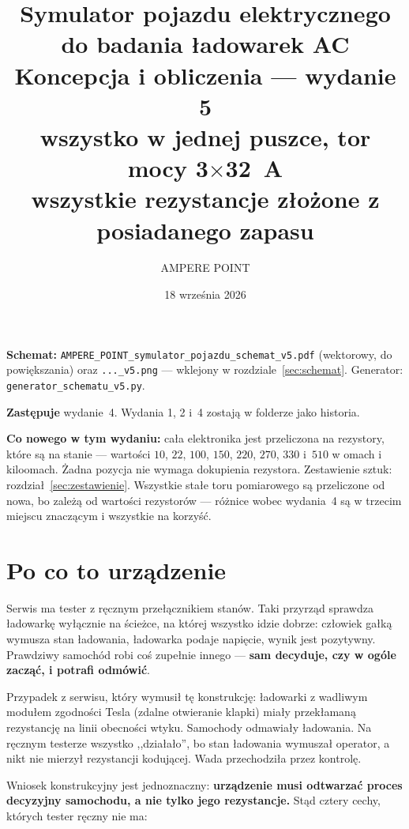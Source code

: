 \documentclass[a4paper,11pt]{article}
\title{\vspace{-1.5cm}Symulator pojazdu elektrycznego do badania ładowarek AC\\[2mm]
\large Koncepcja i obliczenia --- wydanie 5\\[1mm]
\normalsize wszystko w jednej puszce, tor mocy 3$\times$32~A\\[1mm]
\normalsize wszystkie rezystancje złożone z posiadanego zapasu}
\author{AMPERE POINT}
\date{18 września 2026}
\begin{document}
\maketitle
\thispagestyle{empty}

\noindent\textbf{Schemat:} \texttt{AMPERE\_POINT\_symulator\_pojazdu\_schemat\_v5.pdf}
(wektorowy, do powiększania) oraz \texttt{...\_v5.png} --- wklejony w rozdziale~\ref{sec:schemat}.
Generator: \texttt{generator\_schematu\_v5.py}.

\noindent\textbf{Zastępuje} wydanie~4. Wydania 1, 2 i~4 zostają w folderze jako historia.

\noindent\textbf{Co nowego w tym wydaniu:} cała elektronika jest przeliczona na rezystory,
które są na stanie --- wartości $10$, $22$, $100$, $150$, $220$, $270$, $330$ i~$510$
w omach i kiloomach. Żadna pozycja nie wymaga dokupienia rezystora. Zestawienie sztuk:
rozdział~\ref{sec:zestawienie}. Wszystkie stałe toru pomiarowego są przeliczone od nowa,
bo zależą od wartości rezystorów --- różnice wobec wydania~4 są w trzecim miejscu
znaczącym i wszystkie na korzyść.

\tableofcontents

\section{Po co to urządzenie}

Serwis ma tester z ręcznym przełącznikiem stanów. Taki przyrząd sprawdza ładowarkę
wyłącznie na ścieżce, na której wszystko idzie dobrze: człowiek gałką wymusza stan
ładowania, ładowarka podaje napięcie, wynik jest pozytywny. Prawdziwy samochód robi
coś zupełnie innego --- \textbf{sam decyduje, czy w ogóle zacząć, i potrafi odmówić}.

Przypadek z serwisu, który wymusił tę konstrukcję: ładowarki z wadliwym modułem
zgodności Tesla (zdalne otwieranie klapki) miały przekłamaną rezystancję na linii
obecności wtyku. Samochody odmawiały ładowania. Na ręcznym testerze wszystko
,,działało'', bo stan ładowania wymuszał operator, a nikt nie mierzył rezystancji
kodującej. Wada przechodziła przez kontrolę.

Wniosek konstrukcyjny jest jednoznaczny: \textbf{urządzenie musi odtwarzać proces
decyzyjny samochodu, a nie tylko jego rezystancje.} Stąd cztery cechy, których
tester ręczny nie ma:
\end{document}

